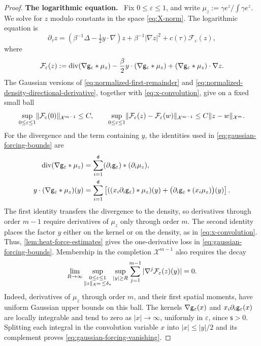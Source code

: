 \documentclass[11pt,reqno]{amsart}
\numberwithin{equation}{section}
\theoremstyle{plain}
\theoremstyle{remark}
\DeclarePairedDelimiter{\norm}{\lVert}{\rVert}
\renewcommand{\d}{\mathsf{d}}\newcommand{\s}{\mathsf{s}}
\DeclareMathOperator{\diver}{div}
\newcommand{\parheading}[1]{\par\medskip\noindent\textbf{#1}\ }
\newcommand{\Xspace}{\mathcal X}
\begin{document}
\begin{proof}
\parheading{The logarithmic equation.}
Fix $0\le\varepsilon\le1$, and write $\mu_z:=\gamma e^z/\int\gamma e^z$. We solve for $z$ modulo constants in the space \eqref{eq:X-norm}. The logarithmic equation is
\begin{equation}\label{eq:gaussian-log-PDE}
 \partial_\tau z=(\beta^{-1}\Delta-\tfrac12y\cdot\nabla)z
       +\beta^{-1}|\nabla z|^2+c(\tau)\mathcal F_\varepsilon(z),
\end{equation}
where
\begin{equation}\label{eq:coupling-nonlinearity}
 \mathcal F_\varepsilon(z):=\diver(\nabla\g_\varepsilon*\mu_z)
            -\frac\beta2 y\cdot(\nabla\g_\varepsilon*\mu_z)
            +(\nabla\g_\varepsilon*\mu_z)\cdot\nabla z.
\end{equation}
The Gaussian versions of \eqref{eq:normalized-first-remainder} and \eqref{eq:normalized-density-directional-derivative}, together with \eqref{eq:x-convolution}, give on a fixed small ball
\begin{equation}\label{eq:gaussian-forcing-bounds}
 \sup_{0\le\varepsilon\le1}\norm{\mathcal F_\varepsilon(0)}_{\Xspace^{m-1}}\le C,
 \qquad
 \sup_{0\le\varepsilon\le1}\norm{\mathcal F_\varepsilon(z)-\mathcal F_\varepsilon(w)}_{\Xspace^{m-1}}
 \le C\norm{z-w}_{\Xspace^m}.
\end{equation}
For the divergence and the term containing $y$, the identities used in \eqref{eq:gaussian-forcing-bounds} are
\begin{align}
 \diver(\nabla\g_\varepsilon*\mu_z)
 &=\sum_{i=1}^{\d}(\partial_i\g_\varepsilon)*(\partial_i\mu_z),
 \label{eq:gaussian-divergence-convolution}\\
 y\cdot(\nabla\g_\varepsilon*\mu_z)(y)
 &=\sum_{i=1}^{\d}\left[((x_i\partial_i\g_\varepsilon)*\mu_z)(y)
       +\bigl(\partial_i\g_\varepsilon*(x_i\mu_z)\bigr)(y)\right].
 \label{eq:gaussian-coordinate-convolution}
\end{align}
The first identity transfers the divergence to the density, so derivatives through order $m-1$ require derivatives of $\mu_z$ only through order $m$. The second identity places the factor $y$ either on the kernel or on the density, as in \eqref{eq:x-convolution}. Thus, \cref{lem:heat-force-estimates} gives the one-derivative loss in \eqref{eq:gaussian-forcing-bounds}. Membership in the completion $\Xspace^{m-1}$ also requires the decay
\begin{equation}\label{eq:gaussian-forcing-vanishing}
 \lim_{R\to\infty}\sup_{\substack{0\le\varepsilon\le1\\ \norm z_{\Xspace^m}\le\delta_*}}
       \sup_{|y|\ge R}\sum_{j=1}^{m-1}|\nabla^j\mathcal F_\varepsilon(z)(y)|=0.
\end{equation}
Indeed, derivatives of $\mu_z$ through order $m$, and their first spatial moments, have uniform Gaussian upper bounds on this ball. The kernels $\nabla\mathsf g_\varepsilon(x)$ and $x_i\partial_i\mathsf g_\varepsilon(x)$ are locally integrable and tend to zero as $|x|\to\infty$, uniformly in $\varepsilon$, since $\s>0$. Splitting each integral in the convolution variable $x$ into $|x|\le|y|/2$ and its complement proves \eqref{eq:gaussian-forcing-vanishing}.


\end{proof}
\end{document}
